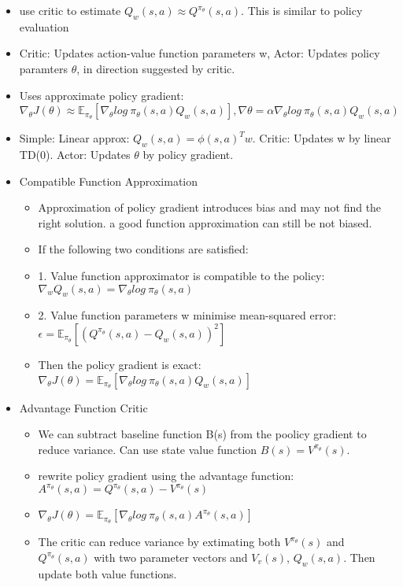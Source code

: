 \begin{itemize}
	\begin{itemize}[noitemsep,nolistsep]
		\item use critic to estimate $Q_w(s,a) \approx Q^{\pi_\theta}(s,a)$. This is similar to policy evaluation
		\item Critic: Updates action-value function parameters w, Actor: Updates policy paramters $\theta$, in direction suggested by critic.
		\item Uses approximate policy gradient: $\nabla_\theta J(\theta) \approx \mathbb{E}_{\pi_\theta}[\nabla_\theta log\ \pi_\theta(s,a) Q_w(s,a)], \nabla \theta = \alpha \nabla_\theta log\ \pi_\theta(s,a) Q_w(s,a)$
		\item Simple: Linear approx: $Q_w(s,a) = \phi(s,a)^Tw$. Critic: Updates w by linear TD(0). Actor: Updates $\theta$ by policy gradient.
		\item Compatible Function Approximation
		\begin{itemize}[noitemsep,nolistsep]
			\item Approximation of policy gradient introduces bias and may not find the right solution. a good function approximation can still be not biased.
			\item If the following two conditions are satisfied:
			\item 1. Value function approximator is compatible to the policy: $\nabla_w Q_w(s,a) = \nabla_\theta log\ \pi_\theta(s,a)$
			\item 2. Value function parameters w minimise mean-squared error: $\epsilon = \mathbb{E}_{\pi_\theta} [(Q^{\pi_\theta}(s,a) - Q_w(s,a))^2]$ 
			\item Then the policy gradient is exact: $\nabla_\theta J(\theta) = \mathbb{E}_{\pi_\theta}[\nabla_\theta log\ \pi_\theta(s,a) Q_w(s,a)]$
		\end{itemize}
		\item Advantage Function Critic
		\begin{itemize}[noitemsep,nolistsep]
			\item We can subtract baseline function B(s) from the poolicy gradient to reduce variance. Can use state value function $B(s) = V^{\pi_\theta}(s)$.
			\item rewrite policy gradient using the advantage function: $A^{\pi_\theta}(s,a) = Q^{\pi_\theta}(s,a) - V^{\pi_\theta}(s)$
			\item $\nabla_\theta J(\theta) = \mathbb{E}_{\pi_\theta}[\nabla_\theta log\ \pi_\theta(s,a) A^{\pi_\theta}(s,a)]$
			\item The critic can reduce variance by extimating both $V^{\pi_\theta}(s)$ and $Q^{\pi_\theta}(s,a)$ with two parameter vectors and $V_v(s)$, $Q_w(s,a)$. Then update both value functions.

\end{itemize}
\end{itemize}
\end{itemize}

